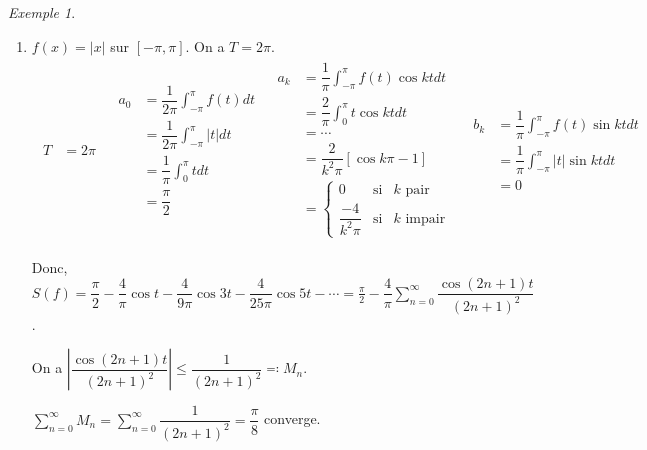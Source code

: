 \documentclass{report}
\newcommand*{\dsum}[4]{\displaystyle\sum_{#1=#2}^{#3}#4}
\newcommand*{\dint}[3]{\displaystyle\int_{#1}^{#2}#3}
\newcommand*{\abs}[1]{\left| #1 \right|}
\newcommand*{\lte}{\leqslant}
\theoremstyle{definition}
\theoremstyle{remark}
\newtheorem*{exem}{Exemple}
\begin{document}
	\begin{exem}~

		\begin{enumerate}[label=\alph*)]
			\item $f(x) = \abs{x}$ sur $[-\pi,\pi]$. On a $T=2\pi$.
			\begin{align*}
				\begin{split}
					T&= 2\pi
				\end{split}
				&
				\begin{split}
					a_0&= \dfrac{1}{2\pi} \dint{-\pi}{\pi}{f(t) dt}\\
					&= \dfrac{1}{2\pi} \dint{-\pi}{\pi}{\abs{t} dt}\\
					&= \dfrac{1}{\pi} \dint{0}{\pi}{t dt}\\
					&= \dfrac{\pi}{2}
				\end{split}
				&
				\begin{split}
					a_k&= \dfrac{1}{\pi} \dint{-\pi}{\pi}{f(t) \cos kt dt}\\
					&= \dfrac{2}{\pi} \dint{0}{\pi}{t \cos kt dt}\\
					&= \dotsb\\
					&= \dfrac{2}{k^2\pi}\left[\cos k\pi - 1\right]\\
					&= \left\{ \begin{array}{rll}
						0&\text{si}&k \text{ pair}\\
						\dfrac{-4}{k^2\pi}&\text{si}&k \text{ impair}
					\end{array} \right.
				\end{split}
				&
				\begin{split}
					b_k&= \dfrac{1}{\pi} \dint{-\pi}{\pi}{f(t) \sin kt dt}\\
					&= \dfrac{1}{\pi} \dint{-\pi}{\pi}{\abs{t} \sin kt dt}\\
					&= 0
				\end{split}
			\end{align*}

			Donc, $S(f) = \dfrac{\pi}{2} - \dfrac{4}{\pi} \cos t - \dfrac{4}{9\pi} \cos 3t - \dfrac{4}{25\pi} \cos 5t - \dotsb = \frac{\pi}{2} - \dfrac{4}{\pi} \dsum{n}{0}{\infty}{\dfrac{\cos(2n+1)t}{(2n+1)^2}}$.

			On a $\abs{\dfrac{\cos(2n+1)t}{(2n+1)^2}} \lte \dfrac{1}{(2n+1)^2} \eqcolon M_n$.

			$\dsum{n}{0}{\infty}{M_n} = \dsum{n}{0}{\infty}{\dfrac{1}{(2n+1)^2}} = \dfrac{\pi}{8}$ converge.


\end{enumerate}
\end{exem}
\end{document}

